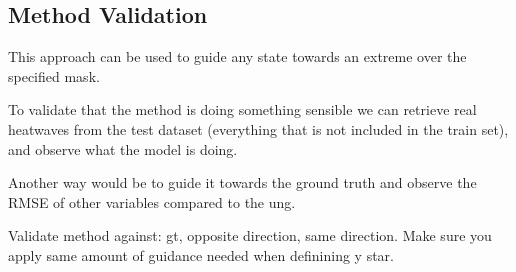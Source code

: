 \subsection{Method Validation}

This approach can be used to guide any state towards an extreme over the specified mask.

To validate that the method is doing something sensible we can retrieve real heatwaves from the test dataset (everything that is not included in the train set), 
and observe what the model is doing.

Another way would be to guide it towards the ground truth and observe the RMSE of other variables compared to the ung.

Validate method against: gt, opposite direction, same direction. Make sure you apply same amount of guidance needed when definining y star.


